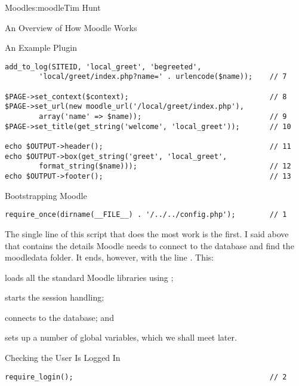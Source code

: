 \begin{aosachapter}{Moodle}{s:moodle}{Tim Hunt}
\begin{aosasect1}{An Overview of How Moodle Works}
\begin{aosasect2}{An Example Plugin}
\begin{verbatim}
add_to_log(SITEID, 'local_greet', 'begreeted',
        'local/greet/index.php?name=' . urlencode($name));    // 7

$PAGE->set_context($context);                                 // 8
$PAGE->set_url(new moodle_url('/local/greet/index.php'),
        array('name' => $name));                              // 9
$PAGE->set_title(get_string('welcome', 'local_greet'));       // 10

echo $OUTPUT->header();                                       // 11
echo $OUTPUT->box(get_string('greet', 'local_greet',
        format_string($name)));                               // 12
echo $OUTPUT->footer();                                       // 13
\end{verbatim}

\end{aosasect2}

\begin{aosasect2}{Bootstrapping Moodle}

\begin{verbatim}
require_once(dirname(__FILE__) . '/../../config.php');        // 1
\end{verbatim}

The single line of this script that does the most work is the first. I
said above that  contains the details Moodle needs to
connect to the database and find the moodledata folder. It ends,
however, with the line . This:

\begin{aosaenumerate}

\item loads all the standard Moodle libraries using
  ;

\item starts the session handling;

\item connects to the database; and

\item sets up a number of global variables, which we shall meet later.

\end{aosaenumerate}

\end{aosasect2}

\begin{aosasect2}{Checking the User Is Logged In}

\begin{verbatim}
require_login();                                              // 2
\end{verbatim}


\end{aosasect2}
\end{aosasect1}
\end{aosachapter}
